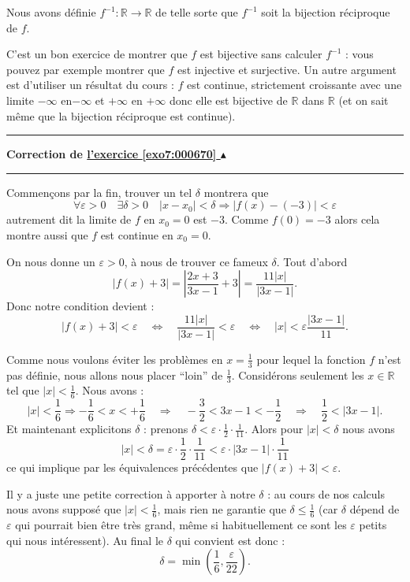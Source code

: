 \documentclass[11pt,a4paper]{article}
\newcommand{\Rr}{\mathbb{R}} \newcommand{\R}{\mathbb{R}}
\renewcommand{\epsilon}{\varepsilon}
\renewcommand{\le}{\leqslant} \renewcommand{\leq}{\leqslant}
\newcounter{exo}
\newcommand{\correction}[1]{\hypertarget{cor7:#1}{}\label{cor7:#1}{\bf Correction de \hyperlink{exo7:#1}{l'exercice \ref{exo7:#1} $\blacktriangle$}}\vspace{1mm}\hrule\vspace{1mm}}
\newcommand{\fincorrection}{\vspace{1mm}\hrule\vspace*{7mm}}
\begin{document}
\begin{enumerate}
Nous avons définie $f^{-1} : \Rr \to \Rr$ de telle sorte que $f^{-1}$ soit la bijection réciproque de $f$.

\bigskip

C'est un bon exercice de montrer que $f$ est bijective sans calculer $f^{-1}$ :
vous pouvez par exemple montrer que $f$ est injective et surjective.
Un autre argument est d'utiliser un résultat du cours : $f$ est continue, strictement croissante avec une limite $-\infty$ en$-\infty$
et $+\infty$ en $+\infty$ donc elle est bijective de $\Rr$ dans $\Rr$ (et on sait même que la bijection réciproque est continue).
\end{enumerate}
\fincorrection
\correction{000670}
Commençons par la fin, trouver un tel $\delta$ montrera que 
$$\forall \epsilon > 0 \quad \exists \delta > 0 \quad |x-x_0| < \delta \Rightarrow |f(x)-(-3)| < \epsilon$$
autrement dit la limite de $f$ en $x_0=0$ est $-3$.
Comme $f(0)=-3$ alors cela montre aussi que $f$ est continue en $x_0=0$.

\bigskip

On nous donne un $\epsilon>0$, à nous de trouver ce fameux $\delta$.
Tout d'abord 
$$\left| f(x)+3 \right| = \left| \frac{2x+3}{3x-1} + 3 \right| = \frac{11|x|}{|3x-1|}.$$
Donc notre condition devient :
$$ \left| f(x)+3 \right| < \epsilon \quad
 \Leftrightarrow \quad \frac{11|x|}{|3x-1|} < \epsilon 
\quad  \Leftrightarrow \quad |x| < \epsilon\frac{|3x-1|}{11}.$$

Comme nous voulons éviter les problèmes en $x = \frac 13$ pour lequel la fonction $f$ n'est pas définie, nous
allons nous placer ``loin'' de $\frac 13$.
Considérons seulement les $x \in \Rr$ tel que $|x| < \frac 16$.
Nous avons :
$$|x| < \frac 16 \Rightarrow -\frac 16 < x < + \frac 16 \quad  \Rightarrow \quad  -\frac 32 < 3x-1 < -\frac 12 \quad \Rightarrow \quad \frac 12 < |3x-1|.$$
Et maintenant explicitons $\delta$ :
prenons $\delta < \epsilon \cdot \frac{1}{2}\cdot \frac{1}{11}$.
Alors pour $|x| < \delta$ nous avons 
$$|x| < \delta = \epsilon \cdot  \frac{1}{2} \cdot \frac{1}{11} < \epsilon \cdot|3x-1|\cdot \frac{1}{11}$$
ce qui implique par les équivalences précédentes que 
$\left| f(x)+3 \right| < \epsilon$.

Il y a juste une petite correction à apporter à notre $\delta$ : au cours de nos calculs
nous avons supposé que $|x| < \frac 16$, mais rien ne garantie que $\delta \le \frac 16$
(car $\delta$ dépend de $\epsilon$ qui pourrait bien être très grand, même
si habituellement ce sont les $\epsilon$ petits qui nous intéressent).
Au final le $\delta$ qui convient est donc :
$$\delta = \min (\frac 16, \frac{\epsilon}{22}).$$
\end{document}
